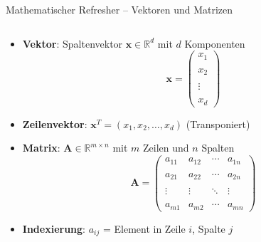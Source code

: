 \documentclass[aspectratio=1610, xcolor=dvipsnames, 9pt]{beamer}
\begin{document}
\begin{frame}{Mathematischer Refresher -- Vektoren und Matrizen}
  \begin{columns}
    \begin{column}{1\textwidth}
      \begin{itemize}
        \item \textbf{Vektor}: Spaltenvektor $\mathbf{x} \in \mathbb{R}^d$ mit $d$ Komponenten
        \begin{equation}
          \mathbf{x} = \begin{pmatrix} x_1 \\\\ x_2 \\\\ \vdots \\\\ x_d \end{pmatrix}
        \end{equation}
        \item \textbf{Zeilenvektor}: $\mathbf{x}^T = (x_1, x_2, \ldots, x_d)$ (Transponiert)
        \item \textbf{Matrix}: $\mathbf{A} \in \mathbb{R}^{m \times n}$ mit $m$ Zeilen und $n$ Spalten
        \begin{equation}
          \mathbf{A} = \begin{pmatrix}
            a_{11} & a_{12} & \cdots & a_{1n} \\\\
            a_{21} & a_{22} & \cdots & a_{2n} \\\\
            \vdots & \vdots & \ddots & \vdots \\\\
            a_{m1} & a_{m2} & \cdots & a_{mn}
          \end{pmatrix}
        \end{equation}
        \item \textbf{Indexierung}: $a_{ij}$ = Element in Zeile $i$, Spalte $j$
      \end{itemize}
    \end{column}
  \end{columns}
\end{frame}
\end{document}

